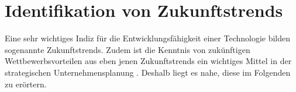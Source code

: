 \section{Identifikation von Zukunftstrends}
\label{futuretrends}

Eine sehr wichtiges Indiz für die Entwicklungsfähigkeit einer Technologie bilden sogenannte Zukunftstrends. Zudem ist die Kenntnis von zukünftigen Wettbewerbsvorteilen aus eben jenen Zukunftstrends ein wichtiges Mittel in der strategischen Unternehmensplanung \cite{mietzner}. Deshalb liegt es nahe, diese im Folgenden zu erörtern.

